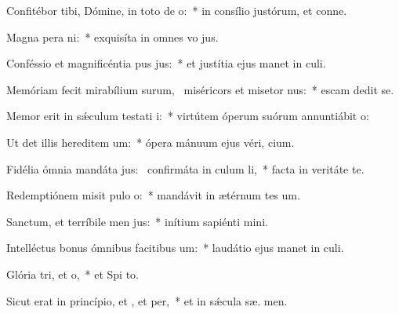 \item Confitébor tibi, Dómine, in toto de o:~* in consílio justórum, et conne.
\item Magna pera ni:~* exquisíta in omnes vo jus.
\item Conféssio et magnificéntia pus jus:~* et justítia ejus manet in  culi.
\item Memóriam fecit mirabílium surum,~\pscross{} miséricors et misetor nus:~* escam dedit  se.
\item Memor erit in sǽculum testati i:~* virtútem óperum suórum annuntiábit  o:
\item Ut det illis hereditem um:~* ópera mánuum ejus véri,  cium.
\item Fidélia ómnia mandáta jus:~\pscross{} confirmáta in culum li,~* facta in veritáte  te.
\item Redemptiónem misit pulo o:~* mandávit in ætérnum tes um.
\item Sanctum, et terríbile men jus:~* inítium sapiénti  mini.
\item Intelléctus bonus ómnibus facitibus um:~* laudátio ejus manet in  culi.
\item Glória tri, et o,~* et Spi to.
\item Sicut erat in princípio, et , et per,~* et in sǽcula sæ. men.
